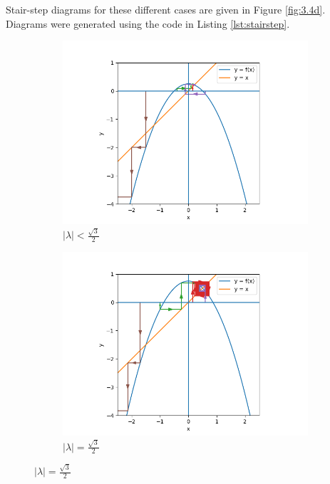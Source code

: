 \documentclass[nonumber]{homework}
\begin{document}
	Stair-step diagrams for these different cases are given in Figure \ref{fig:3.4d}. Diagrams were generated using the code in Listing \ref{lst:stairstep}.
	
	\begin{figure}[h]
		\begin{subfigure}{.33\textwidth}
			\centering
			\includegraphics[width=\linewidth]{3.4d lambda lt sqrt(3)2.png}
			\caption{$|\lambda| < \frac{\sqrt{3}}{2}$}
			\label{fig:3.4dlt}
		\end{subfigure}
		\begin{subfigure}{.33\textwidth}
			\centering
			\includegraphics[width=\linewidth]{3.4d lambda eq sqrt(3)2.png}
			\caption{$|\lambda| = \frac{\sqrt{3}}{2}$}

\end{subfigure}
\end{figure}
\end{document}
